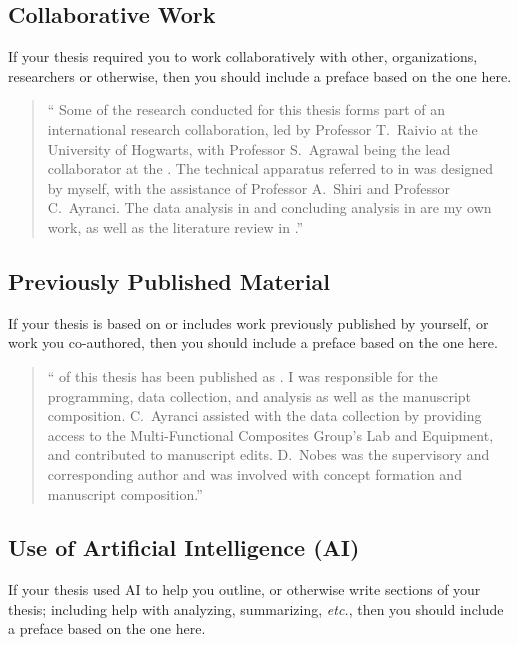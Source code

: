 		\subsection{Collaborative Work}\label{preface:CW}
			If your thesis required you to work collaboratively with other, organizations, researchers or otherwise, then you should include a preface based on the one here.
	
			\begin{quote}
				\singlespacing
				\enquote{%
					Some of the research conducted for this thesis forms part of an international research collaboration, led by Professor T.\ Raivio at the University of Hogwarts, with Professor S.\ Agrawal being the lead collaborator at the \University. 
					The technical apparatus referred to in  was designed by myself, with the assistance of Professor A.\ Shiri and Professor C.\ Ayranci. 
					The data analysis in  and concluding analysis in  are my own work, as well as the literature review in .}
			\end{quote}

		\subsection{Previously Published Material}\label{preface:PPW}
			If your thesis is based on or includes work previously published by yourself, or work you co-authored, then you should include a preface based on the one here.
	
			\begin{quote}
				\singlespacing
				\enquote{%
					 of this thesis has been published as . 
					I was responsible for the programming, data collection, and analysis as well as the manuscript composition. 
					C.\ Ayranci assisted with the data collection by providing access to the Multi-Functional Composites Group's Lab and Equipment, and contributed to manuscript edits. 
					D.\ Nobes was the supervisory and corresponding author and was involved with concept formation and manuscript composition.}
			\end{quote}

		\subsection{Use of Artificial Intelligence (AI)}\label{preface:AI}
			If your thesis used AI to help you outline, or otherwise write sections of your thesis; including help with analyzing, summarizing, \textit{etc.}, then you should include a preface based on the one here.
	

